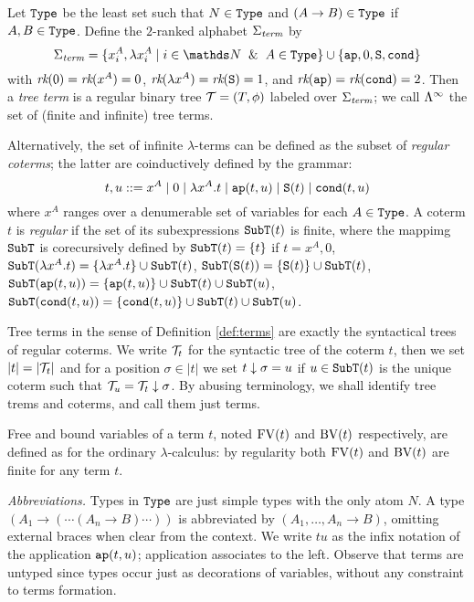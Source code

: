 \begin{definition}\label{def:terms}
Let ${\tt Type}$ be the least
set such that $N \in {\tt Type}$ and $(A \to B) \in {\tt Type}$ if $A,B \in {\tt Type}$.
Define the $2$-ranked alphabet $\Sigma_{\textit{term}}$ by
\[\SigmaTerm = \set{x_i^A, \lambda x_i^A \mid i \in \nat \And A\in \Type} \cup \set{\ap, 0, \Succ, \cond}\]
with $\textit{rk}(0) = \textit{rk}(x^A) = 0$, $\textit{rk}( \lambda x^A) = \textit{rk}({\tt S}) = 1$, and
$\textit{rk}({\tt ap}) = \textit{rk}({\tt cond}) = 2$.
Then a {\em tree term} is a regular binary tree $\BTree = (T, \phi)$ labeled over $\Sigma_{\textit{term}}$; we
call $\Lambda^\infty$ the set of (finite and infinite) tree terms.
\end{definition}

\medskip

Alternatively, the set of infinite $\lambda$-terms can be defined as the subset of {\em regular coterms}; the latter are
coinductively defined by the grammar:
\[ t, u ::= x^A \mid 0 \mid \lambda x^A.t \mid {\tt ap}(t,u) \mid {\tt S} (t) \mid {\tt cond}(t, u) \]
where $x^A$ ranges over a denumerable set of variables for each $A \in {\tt Type}$.
A coterm $t$ is {\em regular} if the set of its subexpressions ${\tt SubT}(t)$ is finite,
where the mappimg ${\tt SubT}$ is corecursively defined by ${\tt SubT}(t) = \{ t \}$ if $t = x^A, 0$, 
${\tt SubT}(\lambda x^A.t) = \{ \lambda x^A.t \} \cup {\tt SubT}(t)$, 
${\tt SubT}({\tt S}(t)) = \{ {\tt S}(t) \} \cup {\tt SubT}(t)$,
${\tt SubT}({\tt ap}(t,u)) = \{ {\tt ap}(t,u) \} \cup {\tt SubT}(t) \cup {\tt SubT}(u)$,
${\tt SubT}({\tt cond}(t,u)) = \{ {\tt cond}(t,u) \} \cup {\tt SubT}(t) \cup {\tt SubT}(u)$.

Tree terms in the sense of Definition \ref{def:terms} are exactly the syntactical trees of regular coterms. 
We write $\BTree_t$ for the syntactic tree of the coterm $t$, then we set $|t| = |\BTree_t|$ and for
a position $\sigma \in |t|$ we set $t \downarrow \sigma = u$ if $u \in {\tt SubT}(t)$ is the unique 
coterm such that $\BTree_u = \SubTree{\BTree_t}{\sigma}$. By abusing terminology, we shall 
identify tree trems and coterms, and call them just terms.

Free and bound variables of a term $t$, noted ${{\rm FV}}(t)$ and ${{\rm BV}}(t)$ respectively, are defined as for the ordinary
$\lambda$-calculus: by regularity both 
${{\rm FV}}(t)$ and ${{\rm BV}}(t)$ are finite for any term $t$.

\medskip
{\em Abbreviations.} Types in ${\tt Type}$ are just simple types with the only atom $N$.
A type $(A_1 \to (\cdots (A_n \to B) \cdots))$ is abbreviated by $(A_1, \ldots, A_n \to B)$,
omitting external braces when clear from the context.
We write $tu$ as the infix notation of the application ${\tt ap}(t,u)$; application associates to the left.
Observe that terms are untyped since types occur just as decorations of variables, without any constraint
to terms formation.


